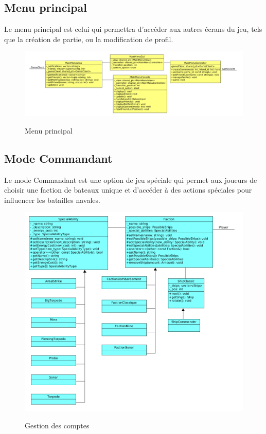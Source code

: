 \documentclass[../design_fonctionnement_sys.tex]{subfiles}
\begin{document}
\subsection{Menu principal}
Le menu principal est celui qui permettra d'accéder aux autres écrans du jeu, tels que la création de partie, ou la modification de profil.
\begin{figure}[H]
    \centering
    \includegraphics[scale=0.3]{img_design/4.4_mainmenu_design.png}
    \label{fig:seq_match_server}
    \caption{Menu principal}
\end{figure}

\newpage
\subsection{Mode Commandant}
Le mode Commandant est une option de jeu spéciale qui permet aux joueurs de choisir une faction de bateaux unique et d'accéder à des actions spéciales pour influencer les batailles navales. 

\begin{figure}[H]
    \centering
    \includegraphics[scale=0.4]{img_design/mode_commandant.png}
    \label{fig:seq_match_server}
    \caption{Gestion des comptes}
\end{figure}
\end{document}
